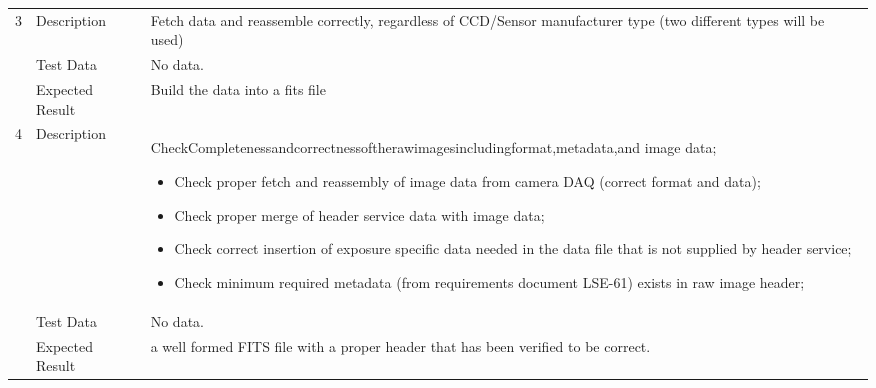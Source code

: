 \begin{longtable}[]{p{1.3cm}p{2cm}p{13cm}}
            \multirow{3}{*}{ 3 } & Description &
            \begin{minipage}[t]{13cm}{\footnotesize
            Fetch data and reassemble correctly, regardless of CCD/Sensor
manufacturer type (two different types will be used)

            \vspace{\dp0}
            } \end{minipage} \\ \cline{2-3}
            & Test Data &
            \begin{minipage}[t]{13cm}{\footnotesize
                No data.
                \vspace{\dp0}
            } \end{minipage} \\ \cline{2-3}
            & Expected Result &
                \begin{minipage}[t]{13cm}{\footnotesize
                Build the data into a fits file

                \vspace{\dp0}
                } \end{minipage}
        \\ \midrule

            \multirow{3}{*}{ 4 } & Description &
            \begin{minipage}[t]{13cm}{\footnotesize
            CheckCompletenessandcorrectnessoftherawimagesincludingformat,metadata,and
image data;

\begin{itemize}
\tightlist
\item
  Check proper fetch and reassembly of image data from camera DAQ
  (correct format and data);
\item
  Check proper merge of header service data with image data;
\item
  Check correct insertion of exposure specific data needed in the data
  file that is not supplied by header service;
\item
  Check minimum required metadata (from requirements document LSE-61)
  exists in raw image header;
\end{itemize}

            \vspace{\dp0}
            } \end{minipage} \\ \cline{2-3}
            & Test Data &
            \begin{minipage}[t]{13cm}{\footnotesize
                No data.
                \vspace{\dp0}
            } \end{minipage} \\ \cline{2-3}
            & Expected Result &
                \begin{minipage}[t]{13cm}{\footnotesize
                a well formed FITS file with a proper header that has been verified to
be correct.~

                \vspace{\dp0}
                } \end{minipage}
        \\ \midrule


\end{longtable}
